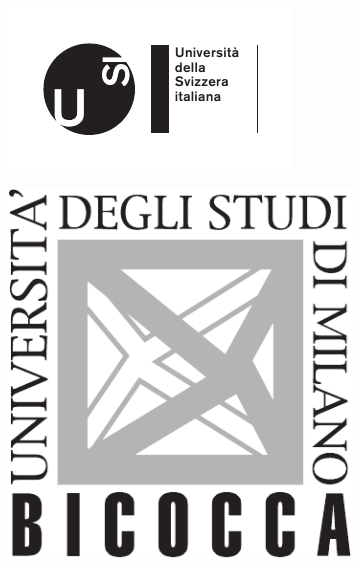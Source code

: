 \pagestyle{cover}
		\begin{center}
			
			\begin{figure}
				\begin{subfigure}[h]{0.18\textwidth}
					\includegraphics[width=\textwidth]{logo-usi}
				\end{subfigure}
				\hfill
				\begin{subfigure}[h]{0.15\textwidth}
					\includegraphics[width=\textwidth]{logo-bicocca}
				\end{subfigure}
				\vspace{10mm}
				\caption*{}
			\end{figure}
		

\end{center}
